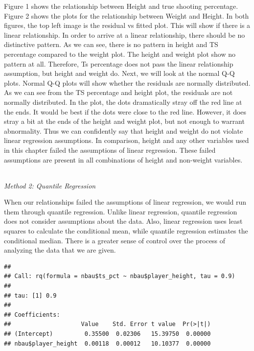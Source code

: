 \documentclass[11pt,letterpaper]{amsart}
\begin{document}
Figure 1 shows the relationship between Height and true shooting percentage. Figure 2 shows the plots for the relationship between Weight and Height. In both figures, the top left image is the residual vs fitted plot. This will show if there is a linear relationship. In order to arrive at a linear relationship, there should be no distinctive pattern. As we can see, there is no pattern in height and TS percentage compared to the weight plot. The height and weight plot show no pattern at all. Therefore, Ts percentage does not pass the linear relationship assumption, but height and weight do. Next, we will look at the normal Q-Q plots. Normal Q-Q plots will show whether the residuals are normally distributed. As we can see from the TS percentage and height plot, the residuals are not normally distributed. In the plot, the dots dramatically stray off the red line at the ends. It would be best if the dots were close to the red line. However, it does stray a bit at the ends of the height and weight plot, but not enough to warrant abnormality. Thus we can confidently say that height and weight do not violate linear regression assumptions. In comparison, height and any other variables used in this chapter failed the assumptions of linear regression. These failed assumptions are present in all combinations of height and non-weight variables.\\
\\
\newpage
\begin{center}
\emph{{\LARGE Method 2: Quantile Regression}}
\end{center} \leavevmode \newline

\indent When our relationships failed the assumptions of linear regression, we would run them through quantile regression. Unlike linear regression, quantile regression does not consider assumptions about the data. Also, linear regression uses least squares to calculate the conditional mean, while quantile regression estimates the conditional median. There is a greater sense of control over the process of analyzing the data that we are given.\\
\begin{verbatim}
## 
## Call: rq(formula = nbau$ts_pct ~ nbau$player_height, tau = 0.9)
## 
## tau: [1] 0.9
## 
## Coefficients:
##                    Value    Std. Error t value  Pr(>|t|)
## (Intercept)         0.35500  0.02306   15.39750  0.00000
## nbau$player_height  0.00118  0.00012   10.10377  0.00000
\end{verbatim}
\end{document}
